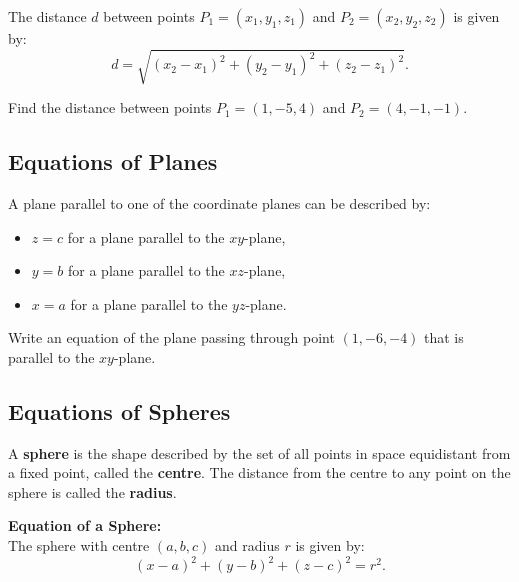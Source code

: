 \documentclass{article}
\begin{document}
\begin{theorembox}
    The distance \(d\) between points \(P_1 = (x_1, y_1, z_1)\) and \(P_2 = (x_2, y_2, z_2)\) is given by:
    \[
    d = \sqrt{(x_2 - x_1)^2 + (y_2 - y_1)^2 + (z_2 - z_1)^2}.
    \]
\end{theorembox}

\begin{exercisebox}
    Find the distance between points \(P_1 = (1, -5, 4)\) and \(P_2 = (4, -1, -1)\).
\end{exercisebox}

\subsection*{Equations of Planes}

A plane parallel to one of the coordinate planes can be described by:
\begin{itemize}
    \item \(z = c\) for a plane parallel to the \(xy\)-plane,
    \item \(y = b\) for a plane parallel to the \(xz\)-plane,
    \item \(x = a\) for a plane parallel to the \(yz\)-plane.
\end{itemize}

\begin{exercisebox}
    Write an equation of the plane passing through point \((1, -6, -4)\) that is parallel to the \(xy\)-plane.
\end{exercisebox}

\subsection*{Equations of Spheres}

\begin{definitionbox}
    A \textbf{sphere} is the shape described by the set of all points in space equidistant from a fixed point, called the \textbf{centre}. The distance from the centre to any point on the sphere is called the \textbf{radius}.
\end{definitionbox}

\begin{theorembox}
    \textbf{Equation of a Sphere:} \\
    The sphere with centre \((a, b, c)\) and radius \(r\) is given by:
    \[
    (x - a)^2 + (y - b)^2 + (z - c)^2 = r^2.
    \]
\end{theorembox}
\end{document}
